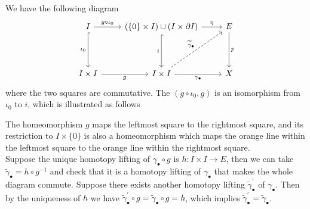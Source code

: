 \documentclass{report}
\begin{document}
\begin{prf}
	We have the following diagram
	\[
	\begin{tikzcd}[ampersand replacement=\&]
		I \arrow[d, "\iota_0"', hook]\arrow[r, "g\circ\iota_0"]\&(\{0\}\times I )\cup (I\times\partial I ) \arrow[r, "\eta"] \arrow[d, "i"', hook]                      \& E \arrow[d, "p"] \\ [+22pt]
		I \times I\arrow[r, "g"']\&I \times I \arrow[r, "\gamma_\bullet"'] \arrow[ru, "\widetilde{\gamma}_\bullet", dashed] \& X               
	\end{tikzcd}
	\]
	where the two squares are commutative. The $(g\circ\iota_0, g)$ is an isomorphism from $\iota_0$ to $i$, which is illustrated as follows
	\begin{center}
	\end{center}
	The homeomorphism $g$ maps the leftmost square to the rightmost square, and its restriction to $I\times\{0\}$ is also a homeomorphism which maps the orange line within the leftmost square to the orange line within the rightmost square.\\
	Suppose the unique homotopy lifting of $\gamma_{\bullet}\circ g$ is $h:I\times I \to E$, then we can take $\widetilde{\gamma}_\bullet=h\circ g^{-1}$ and check that it is a homotopy lifting of $\gamma_\bullet$ that makes the whole diagram commute. Suppose there exists another homotopy lifting $\widetilde{\gamma}_\bullet^\prime$ of $\gamma_\bullet$. Then by the uniqueness of $h$ we have $\widetilde{\gamma}_\bullet^\prime\circ g=\widetilde{\gamma}_\bullet\circ g=h$, which implies $\widetilde{\gamma}_\bullet^\prime=\widetilde{\gamma}_\bullet$.
\end{prf}
\end{document}
